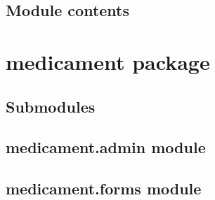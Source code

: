 \documentclass[letterpaper,10pt,english]{sphinxmanual}
\begin{document}

\begin{fulllineitems}
\label{ganados:ganados.views.verify_attempt}
\end{fulllineitems}



\subsection{Module contents}
\label{ganados:module-ganados}\label{ganados:module-contents}

\section{medicament package}
\label{medicament::doc}\label{medicament:medicament-package}

\subsection{Submodules}
\label{medicament:submodules}

\subsection{medicament.admin module}
\label{medicament:module-medicament.admin}\label{medicament:medicament-admin-module}

\subsection{medicament.forms module}
\label{medicament:module-medicament.forms}\label{medicament:medicament-forms-module}
\end{document}
